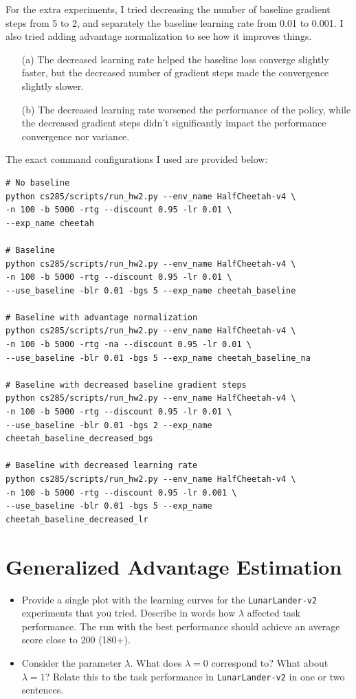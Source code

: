 \documentclass{article}
\begin{document}
\begin{sol}
    For the extra experiments, I tried decreasing the number of baseline gradient steps from 5 to 2, and separately the baseline learning rate from 0.01 to 0.001. I also tried adding advantage normalization to see how it improves things.  
    \begin{itemize}
        \item [(a)] The decreased learning rate helped the baseline loss converge slightly faster, but the decreased number of gradient steps made the convergence slightly slower. 
        \item [(b)] The decreased learning rate worsened the performance of the policy, while the decreased gradient steps didn't significantly impact the performance convergence nor variance.
    \end{itemize}

    The exact command configurations I used are provided below:
    \begin{lstlisting}
# No baseline
python cs285/scripts/run_hw2.py --env_name HalfCheetah-v4 \
-n 100 -b 5000 -rtg --discount 0.95 -lr 0.01 \
--exp_name cheetah

# Baseline
python cs285/scripts/run_hw2.py --env_name HalfCheetah-v4 \
-n 100 -b 5000 -rtg --discount 0.95 -lr 0.01 \
--use_baseline -blr 0.01 -bgs 5 --exp_name cheetah_baseline

# Baseline with advantage normalization
python cs285/scripts/run_hw2.py --env_name HalfCheetah-v4 \
-n 100 -b 5000 -rtg -na --discount 0.95 -lr 0.01 \
--use_baseline -blr 0.01 -bgs 5 --exp_name cheetah_baseline_na

# Baseline with decreased baseline gradient steps
python cs285/scripts/run_hw2.py --env_name HalfCheetah-v4 \
-n 100 -b 5000 -rtg --discount 0.95 -lr 0.01 \
--use_baseline -blr 0.01 -bgs 2 --exp_name cheetah_baseline_decreased_bgs

# Baseline with decreased learning rate
python cs285/scripts/run_hw2.py --env_name HalfCheetah-v4 \
-n 100 -b 5000 -rtg --discount 0.95 -lr 0.001 \
--use_baseline -blr 0.01 -bgs 5 --exp_name cheetah_baseline_decreased_lr
    \end{lstlisting}
\end{sol}

\newpage\section{Generalized Advantage Estimation}
\begin{itemize}
    \item Provide a single plot with the learning curves for the \verb|LunarLander-v2| experiments that you tried. Describe in words how $\lambda$ affected task performance. The run with the best performance should achieve an average score close to 200 (180+).
    \item Consider the parameter $\lambda$. What does $\lambda = 0$ correspond to? What about $\lambda = 1$? Relate this to the task performance in \verb|LunarLander-v2| in one or two sentences.
\end{itemize}
\end{document}
